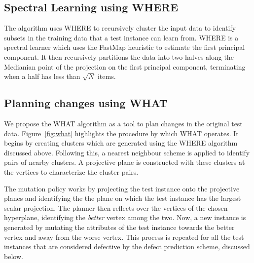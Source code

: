 \documentclass[conference]{IEEEtran}
\begin{document}
\subsection{Spectral Learning using WHERE}
The algorithm uses WHERE to recursively cluster the input data to identify subsets in the training data that a test instance can learn from. WHERE is a spectral learner which uses the FastMap heuristic to estimate the first principal component. It then recursively partitions the data into two halves along the Medianian point of the projection on the first principal component, terminating when a half has less than $\sqrt{N}$ items.   

\subsection{Planning changes using WHAT}
We propose the WHAT algorithm as a tool to plan changes in the original test data. Figure~\ref{fig:what} highlights the procedure by which WHAT operates. It begins by creating clusters which are generated using the WHERE algorithm discussed above. Following this, a nearest neighbour scheme is applied to identify pairs of nearby clusters. A projective plane is constructed with these clusters at the vertices to characterize the cluster pairs.

The mutation policy works by projecting the test instance onto the projective planes and identifying the the plane on which the test instance has the largest scalar projection. The planner then reflects over the vertices of the chosen hyperplane, identifying the \textit{better} vertex among the two. Now, a new instance is generated by mutating the attributes of the test instance towards the better vertex and away from the worse vertex. This process is repeated for all the test instances that are considered defective by the defect prediction scheme, discussed below.
\end{document}
